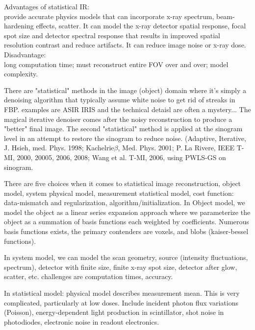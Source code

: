 \newline
Advantages of statistical IR:\\
provide accurate physics models that can incorporate x-ray spectrum, beam-hardening effects, scatter.  It can model the x-ray detector spatial response, focal spot size and detector spectral response that results in improved spatial resolution contrast and reduce artifacts.  It can reduce image noise or x-ray dose.
\newline
Disadvantage: \\
long computation time; must reconstruct entire FOV over and over; model complexity.

There are "statistical" methods in the image (object) domain where it's simply a denoising algorithm that typically assume white noise to get rid of streaks in FBP. examples are ASIR IRIS and the technical detaisl are often a mystery...  The magical iterative denoiser comes after the noisy reconstruction to produce a "better" final image.
The second "statistical" method is applied at the sinogram level in an attempt to restore the sinogram to reduce noise. (Adaptive, Iterative,  J. Hsieh, med. Phys. 1998; Kachelrie$\beta$, Med. Phys. 2001; P. La Rivere, IEEE T-MI, 2000, 20005, 2006, 2008; Wang et al. T-MI, 2006, using PWLS-GS on sinogram.

There are five choices when it comes to statistical image reconstruction, object model, system physical model, measurement statistical model, cost function: data-mismatch and regularization, algorithm/initialization.
In Object model, we model the object as a linear series expansion approach where we parameterize the object as a summation of basis functions each weighted by coefficients.  Numerous basis functions exists, the primary contenders are voxels, and blobs (kaiser-bessel functions).

In system model, we can model the scan geometry, source (intensity fluctuations, spectrum), detector with finite size, finite x-ray spot size, detector after glow, scatter, etc.  challenges are computation times, accuracy.

In statistical model: physical model describes measurement mean. This is very complicated, particularly at low doses.  Include incident photon flux variations (Poisson), energy-dependent light production in scintillator, shot noise in photodiodes, electronic noise in readout electronics.

